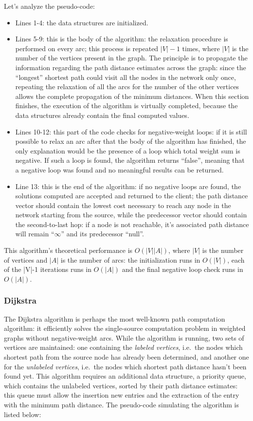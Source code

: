 \documentclass[10pt,a4paper]{report}
\begin{document}
Let's analyze the pseudo-code:
\begin{itemize}
\item Lines 1-4: the data structures are initialized.
\item Lines 5-9: this is the body of the algorithm: the relaxation
  procedure is performed on every arc; this process is repeated
  \(|V|-1\) times, where \(|V|\) is the number of the vertices present
  in the graph. The principle is to propagate the information
  regarding the path distance estimates across the graph: since the
  ``longest'' shortest path could visit all the nodes in the network
  only once, repeating the relaxation of all the arcs for the number
  of the other vertices allows the complete propagation of the minimum
  distances. When this section finishes, the execution of the
  algorithm is virtually completed, because the data structures
  already contain the final computed values.
\item Lines 10-12: this part of the code checks for negative-weight
  loops: if it is still possible to relax an arc after that the body
  of the algorithm has finished, the only explanation would be the
  presence of a loop which total weight sum is negative. If such a
  loop is found, the algorithm returns ``false'', meaning that a
  negative loop was found and no meaningful results can be returned.
\item Line 13: this is the end of the algorithm: if no negative loops
  are found, the solutions computed are accepted and returned to the
  client; the path distance vector should contain the lowest cost
  necessary to reach any node in the network starting from the source,
  while the predecessor vector should contain the second-to-last hop:
  if a node is not reachable, it's associated path distance will
  remain ``\(\infty\)'' and its predecessor ``null''.
\end{itemize}

This algorithm's theoretical performance is \(O(|V||A|)\), where
\(|V|\) is the number of vertices and \(|A|\) is the number of arcs:
the initialization runs in \(O(|V|)\), each of the |V|-1 iterations
runs in \(O(|A|)\) and the final negative loop check runs in
\(O(|A|)\).

\subsubsection{Dijkstra}

The Dijkstra algorithm is perhaps the most well-known path computation
algorithm: it efficiently solves the single-source computation problem
in weighted graphs without negative-weight arcs. While the algorithm
is running, two sets of vertices are maintained: one containing the
\textit{labeled vertices}, i.e.\ the nodes which shortest path from
the source node has already been determined, and another one for the
\textit{unlabeled vertices}, i.e.\ the nodes which shortest path
distance hasn't been found yet. This algorithm requires an additional
data structure, a priority queue, which contains the unlabeled
vertices, sorted by their path distance estimates: this queue must
allow the insertion new entries and the extraction of the entry with
the minimum path distance. The pseudo-code simulating the algorithm is
listed below:
\end{document}
